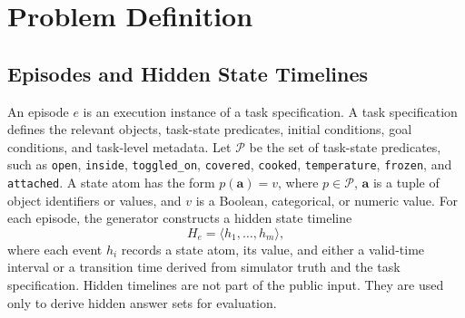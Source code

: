 
\section{Problem Definition}
\label{sec:problem}

\subsection{Episodes and Hidden State Timelines}

An episode $e$ is an execution instance of a task specification. A task specification defines the relevant objects, task-state predicates, initial conditions, goal conditions, and task-level metadata. Let $\mathcal{P}$ be the set of task-state predicates, such as \texttt{open}, \texttt{inside}, \texttt{toggled\_on}, \texttt{covered}, \texttt{cooked}, \texttt{temperature}, \texttt{frozen}, and \texttt{attached}. A state atom has the form $p(\mathbf{a})=v$, where $p\in\mathcal{P}$, $\mathbf{a}$ is a tuple of object identifiers or values, and $v$ is a Boolean, categorical, or numeric value.
For each episode, the generator constructs a hidden state timeline
\begin{equation}
    H_e = \langle h_1,\ldots,h_m\rangle ,
\end{equation}
where each event $h_i$ records a state atom, its value, and either a valid-time interval or a transition time derived from simulator truth and the task specification. Hidden timelines are not part of the public input. They are used only to derive hidden answer sets for evaluation.

